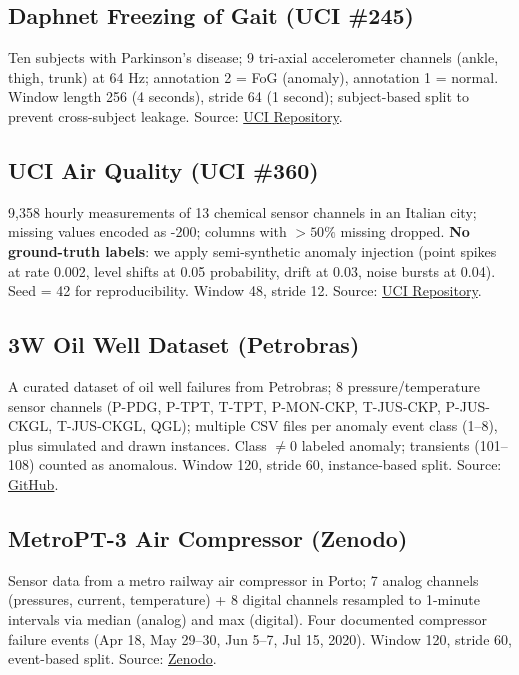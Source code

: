 \documentclass[10pt,twocolumn]{article}
\begin{document}
\subsection{Daphnet Freezing of Gait (UCI \#245)}
Ten subjects with Parkinson's disease; 9 tri-axial accelerometer channels (ankle, thigh, trunk) at 64 Hz; annotation 2 = FoG (anomaly), annotation 1 = normal. Window length 256 (4 seconds), stride 64 (1 second); subject-based split to prevent cross-subject leakage. Source: \href{https://archive.ics.uci.edu/dataset/245}{UCI Repository}.

\subsection{UCI Air Quality (UCI \#360)}
9{,}358 hourly measurements of 13 chemical sensor channels in an Italian city; missing values encoded as -200; columns with $>50\%$ missing dropped. \textbf{No ground-truth labels}: we apply semi-synthetic anomaly injection (point spikes at rate 0.002, level shifts at 0.05 probability, drift at 0.03, noise bursts at 0.04). Seed = 42 for reproducibility. Window 48, stride 12. Source: \href{https://archive.ics.uci.edu/dataset/360}{UCI Repository}.

\subsection{3W Oil Well Dataset (Petrobras)}
A curated dataset of oil well failures from Petrobras; 8 pressure/temperature sensor channels (P-PDG, P-TPT, T-TPT, P-MON-CKP, T-JUS-CKP, P-JUS-CKGL, T-JUS-CKGL, QGL); multiple CSV files per anomaly event class (1--8), plus simulated and drawn instances. Class $\neq 0$ labeled anomaly; transients (101--108) counted as anomalous. Window 120, stride 60, instance-based split. Source: \href{https://github.com/ricardovvargas/3w_dataset}{GitHub}.

\subsection{MetroPT-3 Air Compressor (Zenodo)}
Sensor data from a metro railway air compressor in Porto; 7 analog channels (pressures, current, temperature) + 8 digital channels resampled to 1-minute intervals via median (analog) and max (digital). Four documented compressor failure events (Apr 18, May 29--30, Jun 5--7, Jul 15, 2020). Window 120, stride 60, event-based split. Source: \href{https://zenodo.org/record/3657010}{Zenodo}.
\end{document}
